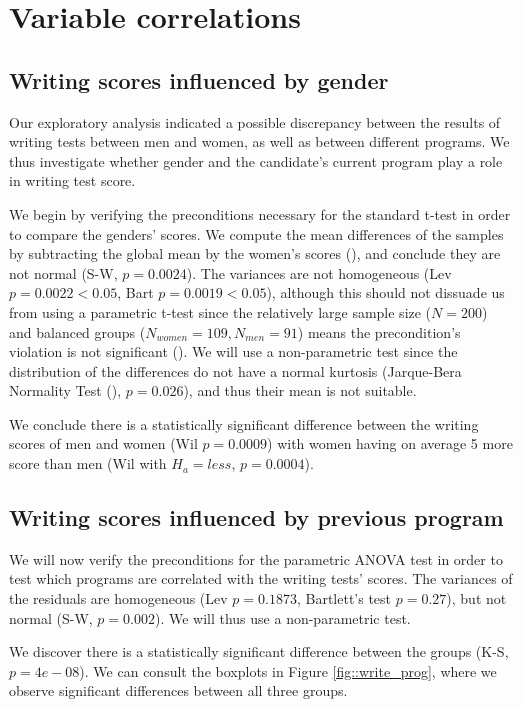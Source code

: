 \documentclass[10pt, a4paper]{article}
\begin{document}
	\section{Variable correlations}
	\label{sec::var_cors}
	
	\subsection{Writing scores influenced by gender}
	Our exploratory analysis indicated a possible discrepancy between the results of writing tests between men and women, as well as between different programs. We thus investigate whether gender and the candidate's current program play a role in writing test score.
	
	We begin by verifying the preconditions necessary for the standard t-test in order to compare the genders' scores. We compute the mean differences of the samples by subtracting the global mean by the women's scores (\textcite{means}), and conclude they are not normal (S-W, $p = 0.0024$). The variances are not homogeneous (Lev $p = 0.0022 < 0.05$, Bart $p = 0.0019 < 0.05$), although this should not dissuade us from using a parametric t-test since the relatively large sample size ($N=200$) and balanced groups ($N_{women} = 109, N_{men} = 91$) means the precondition's violation is not significant (\textcite{variances}). We will use a non-parametric test since the distribution of the differences do not have a normal kurtosis (Jarque-Bera Normality Test (\textcite{jarque}), $p=0.026$), and thus their mean is not suitable.
	
	We conclude there is a statistically significant difference between the writing scores of men and women (Wil $p = 0.0009$) with women having on average 5 more score than men (Wil with $H_a = less$, $p = 0.0004$).
	
	
	\subsection{Writing scores influenced by previous program}
	We will now verify the preconditions for the parametric ANOVA test in order to test which programs are correlated with the writing tests' scores. The variances of the residuals are homogeneous (Lev $p = 0.1873$, Bartlett's test $p = 0.27$), but not normal (S-W, $p = 0.002$). We will thus use a non-parametric test.
	
	We discover there is a statistically significant difference between the groups (K-S, $p=4e-08$). We can consult the boxplots in Figure \ref{fig::write_prog}, where we observe significant differences between all three groups.
	
\end{document}
